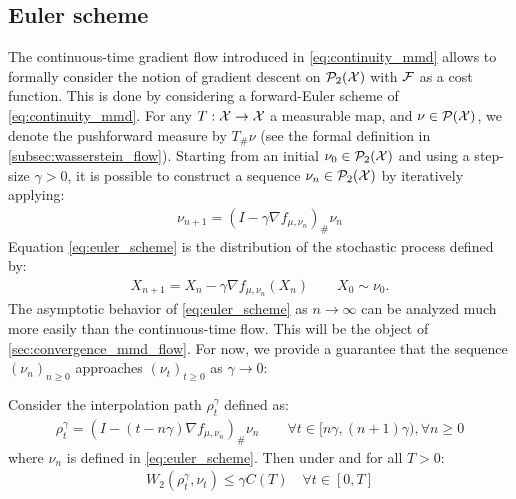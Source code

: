 \subsection{Euler scheme}
The continuous-time gradient flow introduced in \cref{eq:continuity_mmd} allows to formally consider the notion of gradient descent on $\mathcal{P}_2({{\mathcal X}})$ with ${{\mathcal F}}$ as a cost function. This is done by considering a forward-Euler scheme of \cref{eq:continuity_mmd}. For any $T: {{\mathcal X}} \rightarrow {{\mathcal X}}$ a measurable map, and $\nu \in \mathcal{P}({{\mathcal X}})$, we denote the pushforward measure by $T_{\#}\nu$ (see the formal definition in \cref{subsec:wasserstein_flow}). Starting from an initial $\nu_0\in \mathcal{P}_2({{\mathcal X}})$ and using a step-size $\gamma>0$, it is possible to construct a sequence $\nu_n\in \mathcal{P}_2({{\mathcal X}})$ by iteratively applying:
\begin{align}\label{eq:euler_scheme}
	\nu_{n+1} = (I - \gamma \nabla f_{\mu,\nu_n})_{\#}\nu_n
\end{align} 
Equation \cref{eq:euler_scheme} is the distribution of the stochastic process defined by:
\begin{align}\label{eq:euler_scheme_particles}
	X_{n+1} = X_n - \gamma \nabla f_{\mu,\nu_n}(X_n) \qquad X_0\sim \nu_0.
\end{align}
The asymptotic behavior of \cref{eq:euler_scheme} as $n\rightarrow \infty$ can be analyzed much more easily than the continuous-time flow.  This will be the object of \cref{sec:convergence_mmd_flow}. For now, we provide a guarantee that the sequence $(\nu_n)_{n\geq 0}$ approaches $(\nu_t)_{t\geq 0}$ as $\gamma\rightarrow 0$:
\begin{proposition}\label{prop:convergence_euler_scheme}
	Consider the interpolation path $\rho_t^{\gamma}$ defined as:
	\begin{align}
		\rho_t^{\gamma} = (I-(t- n\gamma) \nabla f_{\mu,\nu_n})_{\#}\nu_n \qquad \forall t\in [n\gamma,(n+1)\gamma), \forall n\geq 0
	\end{align}
where $\nu_n$ is defined in \cref{eq:euler_scheme}. Then under  and for all $T>0$:
	\begin{align}
		W_2(\rho_t^{\gamma},\nu_t)\leq \gamma C(T) \quad \forall t\in [0,T]
	\end{align}
\end{proposition} 
